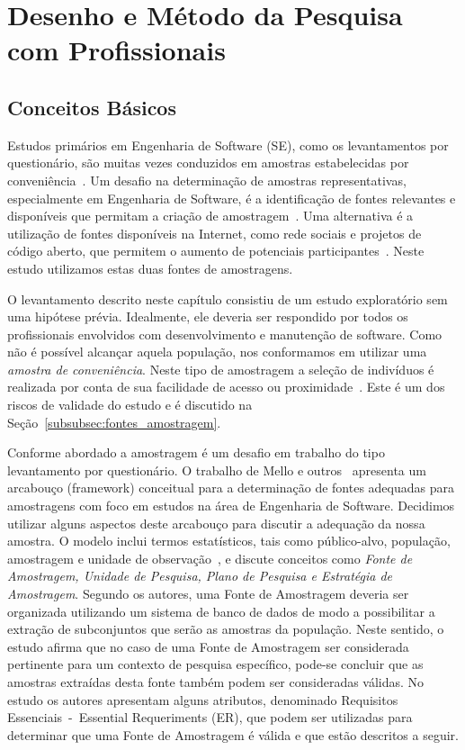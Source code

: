 \section{Desenho e Método da Pesquisa com Profissionais}\label{sec:desenho_da_pesquisa_com_profissionais}

\subsection{Conceitos Básicos}

Estudos primários em Engenharia de Software (SE), como os levantamentos por
questionário, são muitas vezes conduzidos em amostras estabelecidas por
conveniência~\cite{sjoberg2005survey, dybaa2006systematic}. Um desafio na
determinação de amostras representativas, especialmente em Engenharia de
Software, é a identificação de fontes relevantes e disponíveis que permitam a
criação de amostragem~\cite{de2014towards}. Uma alternativa é a utilização de
fontes disponíveis na Internet, como rede sociais e projetos de código aberto,
que permitem o aumento de potenciais participantes~\cite{de2013would}. Neste
estudo utilizamos estas duas fontes de amostragens.

O levantamento descrito neste capítulo consistiu de um estudo exploratório sem
uma hipótese prévia. Idealmente, ele deveria ser respondido por todos os
profissionais envolvidos com desenvolvimento e manutenção de software. Como não
é possível alcançar aquela população, nos conformamos em utilizar uma
\textit{amostra de conveniência}. Neste tipo de amostragem a seleção de
indivíduos é realizada por conta de sua facilidade de acesso ou
proximidade~\cite{marshall1996sampling}. Este é um dos riscos de validade do
estudo e é discutido na Seção~\ref{subsubsec:fontes_amostragem}.

Conforme abordado a amostragem é um desafio em trabalho do tipo levantamento
por questionário. O trabalho de Mello e outros~\cite{de2014towards} apresenta um
arcabouço (framework) conceitual para a determinação de fontes adequadas para
amostragens com foco em estudos na área de Engenharia de Software. Decidimos
utilizar alguns aspectos deste arcabouço para discutir a adequação da nossa
amostra. O modelo inclui termos estatísticos, tais como público-alvo, população,
amostragem e unidade de observação~\cite{thompson2012sampling}, e discute
conceitos como \textit{Fonte de Amostragem, Unidade de Pesquisa, Plano de
    Pesquisa e Estratégia de Amostragem}. Segundo os autores, uma Fonte de
Amostragem deveria ser organizada utilizando um sistema de banco de dados de
modo a possibilitar a extração de subconjuntos que serão as amostras da
população. Neste sentido, o estudo afirma que no caso de uma Fonte de Amostragem
ser considerada pertinente para um contexto de pesquisa específico, pode-se
concluir que as amostras extraídas desta fonte também podem ser consideradas
válidas. No estudo os autores apresentam alguns atributos, denominado
Requisitos Essenciais~-~Essential Requeriments (ER), que podem ser utilizadas
para determinar que uma Fonte de Amostragem é válida e que estão descritos a
seguir.

